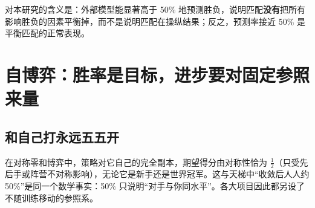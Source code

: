 对本研究的含义是：外部模型能显著高于 50\% 地预测胜负，说明匹配\textbf{没有}把所有影响胜负的因素平衡掉，而不是说明匹配在操纵结果；反之，预测率接近 50\% 是平衡匹配的正常表现。

\section{自博弈：胜率是目标，进步要对固定参照来量}
\label{sec:ch4-selfplay}

\subsection{和自己打永远五五开}

在对称零和博弈中，策略对它自己的完全副本，期望得分由对称性恰为 $\tfrac12$（只受先后手或阵营不对称影响），无论它是新手还是世界冠军。这与天梯中“收敛后人人约 50\%”是同一个数学事实：50\% 只说明“对手与你同水平”。各大项目因此都另设了不随训练移动的参照系。

